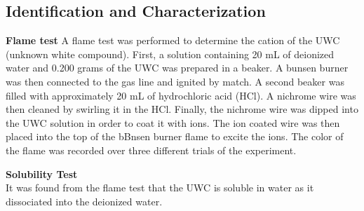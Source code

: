 \documentclass[12pt]{article}
\begin{document}
\subsection{Identification and Characterization}
\textbf{Flame test}
A flame test was performed to determine the cation of the UWC (unknown white compound). First, a solution containing 20 mL of deionized water and 0.200 grams of the UWC was prepared in a beaker. A bunsen burner was then connected to the gas line and ignited by match. A second beaker was filled with approximately 20 mL of hydrochloric acid (HCl). A nichrome wire was then cleaned by swirling it in the HCl. Finally, the nichrome wire was dipped into the UWC solution in order to coat it with ions. The ion coated wire was then placed into the top of the bBnsen burner flame to excite the ions. The color of the flame was recorded over three different trials of the experiment.

\vspace{6pt}\textbf{Solubility Test}
\\It was found from the flame test that the UWC is soluble in water as it dissociated into the deionized water.
\end{document}

